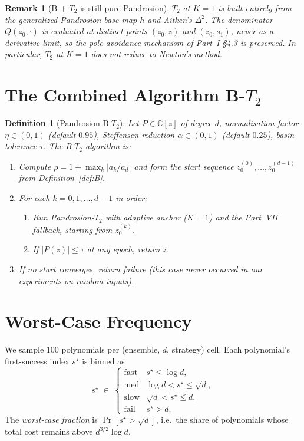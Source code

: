 \documentclass[11pt,a4paper]{article}
\newtheorem{definition}[theorem]{Definition}
\newtheorem{remark}[theorem]{Remark}
\begin{document}
\begin{remark}[B + $T_2$ is still pure Pandrosion]
$T_2$ at $K = 1$ is built entirely from the generalized Pandrosion base map $h$ and Aitken's $\Delta^2$. The denominator $Q(z_0, \cdot)$ is evaluated at distinct points $(z_0, z)$ and $(z_0, s_1)$, never as a derivative limit, so the pole-avoidance mechanism of Part~I \S4.3 is preserved. In particular, $T_2$ at $K = 1$ does \emph{not} reduce to Newton's method.
\end{remark}

\section{The Combined Algorithm B-$T_2$}

\begin{definition}[Pandrosion B-$T_2$]\label{def:BT2}
Let $P \in \mathbb{C}[z]$ of degree $d$, normalisation factor $\eta \in (0,1)$ (default $0.95$), Steffensen reduction $\alpha \in (0,1)$ (default $0.25$), basin tolerance $\tau$. The B-$T_2$ algorithm is:
\begin{enumerate}
\item Compute $\rho = 1 + \max_k |a_k/a_d|$ and form the start sequence $z_0^{(0)}, \dots, z_0^{(d-1)}$ from Definition~\ref{def:B}.
\item For each $k = 0, 1, \dots, d-1$ in order:
\begin{enumerate}
\item Run Pandrosion-$T_2$ with adaptive anchor ($K = 1$) and the Part~VII fallback, starting from $z_0^{(k)}$.
\item If $|P(z)| \le \tau$ at any epoch, return $z$.
\end{enumerate}
\item If no start converges, return failure (this case never occurred in our experiments on random inputs).
\end{enumerate}
\end{definition}

\section{Worst-Case Frequency}\label{sec:freq}

We sample $100$ polynomials per (ensemble, $d$, strategy) cell. Each polynomial's first-success index $s^\star$ is binned as
$$ s^\star \;\in\; \begin{cases} \text{fast} & s^\star \le \log d, \\ \text{med} & \log d < s^\star \le \sqrt d, \\ \text{slow} & \sqrt d < s^\star \le d, \\ \text{fail} & s^\star > d. \end{cases} $$
The \emph{worst-case fraction} is $\Pr[s^\star > \sqrt d]$, i.e.\ the share of polynomials whose total cost remains above $d^{3/2} \log d$.
\end{document}
